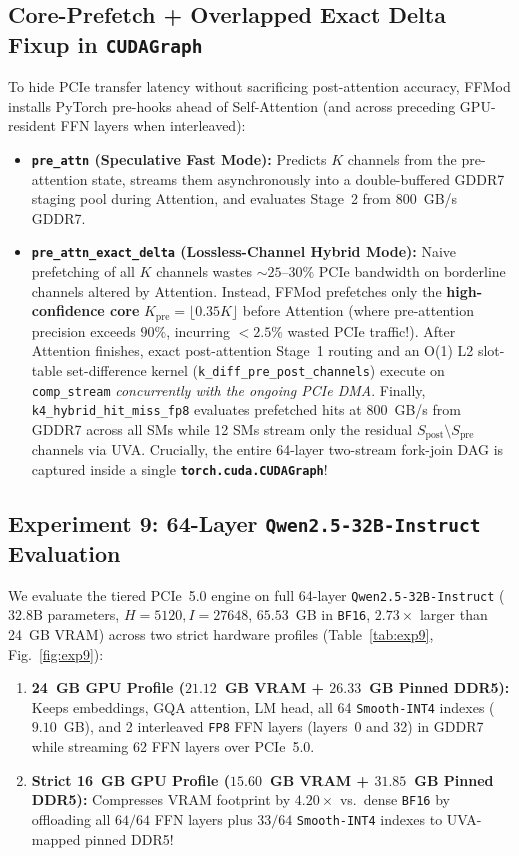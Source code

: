\documentclass[10pt,twocolumn]{article}
\begin{document}
\subsection{Core-Prefetch + Overlapped Exact Delta Fixup in \texttt{CUDAGraph}}
To hide PCIe transfer latency without sacrificing post-attention accuracy, FFMod installs PyTorch pre-hooks ahead of Self-Attention (and across preceding GPU-resident FFN layers when interleaved):
\begin{itemize}
  \item \textbf{\texttt{pre\_attn} (Speculative Fast Mode):} Predicts $K$ channels from the pre-attention state, streams them asynchronously into a double-buffered GDDR7 staging pool during Attention, and evaluates Stage~2 from $800$~GB/s GDDR7.
  \item \textbf{\texttt{pre\_attn\_exact\_delta} (Lossless-Channel Hybrid Mode):} Naive prefetching of all $K$ channels wastes $\sim 25\text{--}30\%$ PCIe bandwidth on borderline channels altered by Attention. Instead, FFMod prefetches only the \textbf{high-confidence core} $K_{\mathrm{pre}} = \lfloor 0.35 K\rfloor$ before Attention (where pre-attention precision exceeds $90\%$, incurring $<2.5\%$ wasted PCIe traffic!). After Attention finishes, exact post-attention Stage~1 routing and an O(1) L2 slot-table set-difference kernel (\texttt{k\_diff\_pre\_post\_channels}) execute on \texttt{comp\_stream} \emph{concurrently with the ongoing PCIe DMA}. Finally, \texttt{k4\_hybrid\_hit\_miss\_fp8} evaluates prefetched hits at $800$~GB/s from GDDR7 across all SMs while 12 SMs stream only the residual $S_{\mathrm{post}}\setminus S_{\mathrm{pre}}$ channels via UVA. Crucially, the entire 64-layer two-stream fork-join DAG is captured inside a single \textbf{\texttt{torch.cuda.CUDAGraph}}!
\end{itemize}

\subsection{Experiment 9: 64-Layer \texttt{Qwen2.5-32B-Instruct} Evaluation}
We evaluate the tiered PCIe~5.0 engine on full 64-layer \texttt{Qwen2.5-32B-Instruct} ($32.8\text{B}$ parameters, $H=5120, I=27648$, $65.53$~GB in \texttt{BF16}, $2.73\times$ larger than 24~GB VRAM) across two strict hardware profiles (Table~\ref{tab:exp9}, Fig.~\ref{fig:exp9}):
\begin{enumerate}
  \item \textbf{24~GB GPU Profile ($21.12$~GB VRAM + $26.33$~GB Pinned DDR5):} Keeps embeddings, GQA attention, LM head, all 64 \texttt{Smooth-INT4} indexes ($9.10$~GB), and 2 interleaved \texttt{FP8} FFN layers (layers~0 and 32) in GDDR7 while streaming 62 FFN layers over PCIe~5.0.
  \item \textbf{Strict 16~GB GPU Profile ($15.60$~GB VRAM + $31.85$~GB Pinned DDR5):} Compresses VRAM footprint by \textbf{$4.20\times$} vs.\ dense \texttt{BF16} by offloading all $64/64$ FFN layers plus $33/64$ \texttt{Smooth-INT4} indexes to UVA-mapped pinned DDR5!
\end{enumerate}
\end{document}

